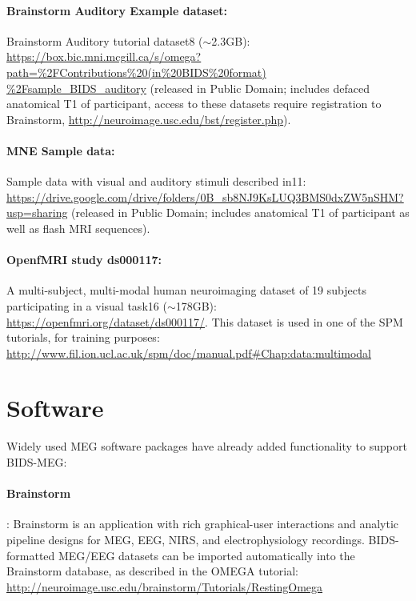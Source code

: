 \paragraph{Brainstorm Auditory Example dataset:} Brainstorm Auditory tutorial dataset8 ($\sim$2.3GB):
\url{https://box.bic.mni.mcgill.ca/s/omega?
path=\%2FContributions\%20(in\%20BIDS\%20format)
\%2Fsample_BIDS_auditory} (released in Public Domain; includes defaced anatomical T1 of participant, access to these datasets require registration to Brainstorm, \url{http://neuroimage.usc.edu/bst/register.php}). 

\paragraph{MNE Sample data:} Sample data with visual and auditory stimuli described in11:
\url{https://drive.google.com/drive/folders/0B_sb8NJ9KsLUQ3BMS0dxZW5nSHM?usp=sharing} (released in Public Domain; includes anatomical T1 of participant as well as flash MRI sequences). 

\paragraph{OpenfMRI study ds000117:} A multi-subject, multi-modal human neuroimaging dataset of 19 subjects participating in a visual task16 ($\sim$178GB): \url{https://openfmri.org/dataset/ds000117/}. This dataset is used in one of the SPM tutorials, for training purposes:
\url{http://www.fil.ion.ucl.ac.uk/spm/doc/manual.pdf#Chap:data:multimodal}

\section{Software}
Widely used MEG software packages have already added functionality to support BIDS-MEG:

\paragraph{Brainstorm}\citep{tadel2011brainstorm}: Brainstorm is an application with rich graphical-user interactions and analytic pipeline designs for MEG, EEG, NIRS, and electrophysiology recordings. BIDS-formatted MEG/EEG datasets can be imported automatically into the Brainstorm database, as described in the OMEGA tutorial: \url{http://neuroimage.usc.edu/brainstorm/Tutorials/RestingOmega}

